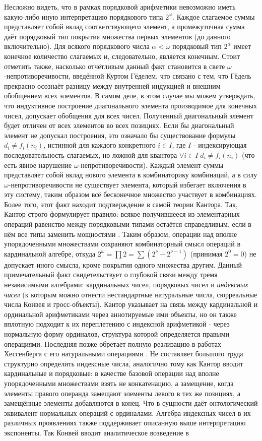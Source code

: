 \documentclass[12pt]{article}
\begin{document}
Несложно видеть, что в рамках порядковой арифметики невозможно иметь какую-либо иную интерпретацию порядкового типа $2^{\omega}$. Каждое слагаемое суммы представляет собой вклад соответствующего элемент, а промежуточная сумма даёт порядковый тип покрытия множества первых элементов (до данного включительно). Для всякого порядкового числа $\alpha < \omega$ порядковый тип $2^{\alpha}$ имеет конечное количество слагаемых и, следовательно, является конечным. Стоит отметить также, насколько отчётливым данный факт становится в свете $\omega$-непротиворечивости, введённой Куртом Гёделем, что связано с тем, что Гёдель прекрасно осознаёт разницу между внутренней индукцией и внешним обобщением всех элементов. В самом деле, в этом случае мы можем утверждать, что индуктивное построение диагонального элемента производимое для конечных чисел, допускает обобщения для всех чисел. Полученный диагональный элемент будет отличен от всех элементов во всех позициях. Если бы диагональный элемент не допускал построения, это означало бы существование формулы $d_i \neq f_i(n_i)$, истинной для каждого конкретного $i \in I$, где $I$ - индексирующая последовательность слагаемых, но ложной для квантора $\forall i \in I \; d_i \neq f_i(n_i)$ (что есть явное нарушение $\omega$-непротиворечивости). Каждый элемент суммы представляет собой вклад нового элемента в комбинаторику комбинаций, а в силу $\omega$-непротиворечивости не существует элемента, который избегает включения в эту систему, таким образом всё бесконечное множество участвует в комбинациях. Более того, этот факт находит подтверждение в самой теории Кантора. Так, Кантор строго формулирует правило: всякое получившееся из элементарных операций равенство между порядковыми типами остаётся справедливым, если в нём все типы заменить мощностями \cite{cantor-ordinal-to-cardinal}. Таким образом, операции над вполне упорядоченными множествами сохраняют комбинаторный смысл операций в кардинальной алгебре, откуда $2^{\omega} = \prod 2 = \sum (2^{\nu} - 2^{\nu - 1})$ (принимая $2^0 = 0$) не допускает иного смысла, кроме покрытия одного множества другим. Данный примечательный факт свидетельствует о глубокой связи между тремя независимыми алгебрами: кардинальных чисел, порядковых чисел и {\it индексных чисел} (к которым можно отнести нестандартные натуральные числа, сюрреальные числа Конвея и гросс-объекты). Кантор указывает на связь между кардинальной и ординальной арифметиками через аннотируемые ими объекты, но он также вплотную подходит к их переплетению с индексной арифметикой - через нормальную форму ординалов, структура которой определяется правыми операциями. Последняя позже обретает полную реализацию в работах Хессенберга с его натуральными операциями \cite{hessenberg-natural}. Не составляет большого труда структурно определить индексные числа, аналогично тому как Кантор вводит кардинальные и порядковые: в качестве базовой операции над вполне упорядоченными множествами взять не конкатенацию, а замещение, когда элементы правого операнда замещают элементы левого в тех же позициях, а замещённые элементы добавляются в конец. Что в сущности даёт онтологический эквивалент нормальных операций с ординалами. Алгебра индексных чисел в их различных проявлениях также поддерживает описанную выше интерпретацию экспоненты. Так Конвей вводит аналитическое возведение в 
\end{document}
